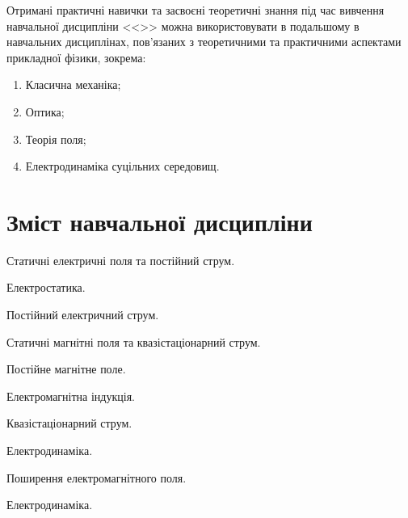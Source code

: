 \documentclass{Syllabus}
\begin{document}
Отримані практичні навички та засвоєні теоретичні знання під час вивчення навчальної дисципліни <<\discipline>> можна використовувати в подальшому в навчальних дисциплінах, пов’язаних з теоретичними та практичними аспектами прикладної фізики, зокрема:

\begin{enumerate}
    \item Класична механіка;
    \item Оптика;
    \item Теорія поля;
    \item Електродинаміка суцільних середовищ.
\end{enumerate}


\section{Зміст навчальної дисципліни}


\begin{Rozdil}
\item Статичні електричні поля та постійний струм.
    \begin{Rozdil}
        \item Електростатика.
        \item Постійний електричний струм.
    \end{Rozdil}
\item Статичні магнітні поля та квазістаціонарний струм.
    \begin{Rozdil}
        \item Постійне магнітне поле.
        \item Електромагнітна індукція.
        \item Квазістаціонарний струм.
    \end{Rozdil}	
\item Електродинаміка.
    \begin{Rozdil}
        \item Поширення електромагнітного поля.
        \item Електродинаміка.
    \end{Rozdil}	
\end{Rozdil}

%
\end{document}
